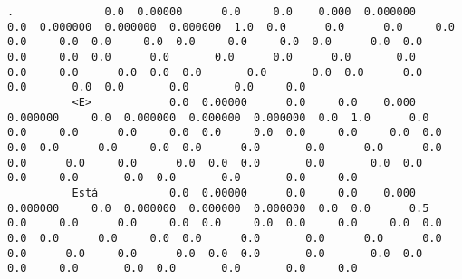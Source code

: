 \documentclass[11pt]{article}
\begin{document}
\begin{Verbatim}[commandchars=\\\{\}]
          .              0.0  0.00000      0.0     0.0    0.000  0.000000     0.0  0.000000  0.000000  0.000000  1.0  0.0      0.0      0.0     0.0      0.0     0.0  0.0     0.0  0.0     0.0     0.0  0.0      0.0  0.0      0.0     0.0  0.0      0.0       0.0      0.0      0.0       0.0      0.0     0.0      0.0  0.0  0.0       0.0       0.0  0.0      0.0     0.0       0.0  0.0       0.0       0.0     0.0   
          <E>            0.0  0.00000      0.0     0.0    0.000  0.000000     0.0  0.000000  0.000000  0.000000  0.0  1.0      0.0      0.0     0.0      0.0     0.0  0.0     0.0  0.0     0.0     0.0  0.0      0.0  0.0      0.0     0.0  0.0      0.0       0.0      0.0      0.0       0.0      0.0     0.0      0.0  0.0  0.0       0.0       0.0  0.0      0.0     0.0       0.0  0.0       0.0       0.0     0.0   
          Está           0.0  0.00000      0.0     0.0    0.000  0.000000     0.0  0.000000  0.000000  0.000000  0.0  0.0      0.5      0.0     0.0      0.0     0.0  0.0     0.0  0.0     0.0     0.0  0.0      0.0  0.0      0.0     0.0  0.0      0.0       0.0      0.0      0.0       0.0      0.0     0.0      0.0  0.0  0.0       0.0       0.0  0.0      0.0     0.0       0.0  0.0       0.0       0.0     0.0   
          

\end{Verbatim}
\end{document}
